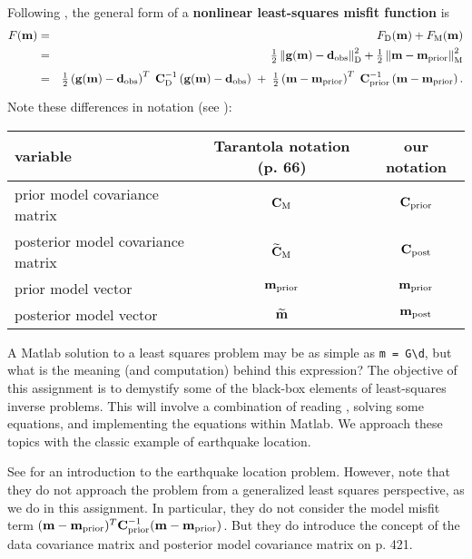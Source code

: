 \documentclass[11pt,titlepage,fleqn]{article}
\begin{document}
Following \citet[][p.~205]{Tarantola2005}, the general form of a {\bf nonlinear least-squares misfit function} is
%
\begin{eqnarray*}
\misfitvar(\bem) &=& \misfitvar_{\rm D}(\bem) + \misfitvar_{\rm M}(\bem) 
\\
&=& \hlf \left\| \bg(\bem) - \bd_{\rm obs} \right\|^2_{\rm D} + \hlf \left\| \bem - \mprior \right\|^2_{\rm M}
\nonumber \\
&=& \hlf \left( \bg(\bem) - \bd_{\rm obs}\right)^T \; \covdi \left( \bg(\bem) - \bd_{\rm obs} \right)
\;+\; \hlf \left( \bem - \mprior \right)^T \; \cpriori \left( \bem - \mprior \right).
\nonumber
\end{eqnarray*}
%
Note these differences in notation (see ):

\vspace{0.2cm}
\begin{tabular}{l|c|c}
\hline
variable                            & Tarantola notation (p. 66)       & our notation \\ \hline
prior model covariance matrix       & $\mbox{${\bf C}$}_{\rm M}$                     & $\mbox{${\bf C}$}_{\rm prior}$    \\ \hline
posterior model covariance matrix   & $\widetilde{\mbox{${\bf C}$}}_{\rm M}$         & $\mbox{${\bf C}$}_{\rm post}$     \\ \hline
prior model vector                  & $\mbox{${\bf m}$}_{\rm prior}$                        & $\mbox{${\bf m}$}_{\rm prior}$     \\ \hline
posterior model vector              & $\widetilde{\mbox{${\bf m}$}}$               & $\mbox{${\bf m}$}_{\rm post}$     \\ \hline
\hline
\end{tabular}
\vspace{0.2cm}

A Matlab solution to a least squares problem may be as simple as \verb+m = G\d+, but what is the meaning (and computation) behind this expression? The objective of this assignment is to demystify some of the black-box elements of least-squares inverse problems. This will involve a combination of reading \citet{Tarantola2005}, solving some equations, and implementing the equations within Matlab. We approach these topics with the classic example of earthquake location.

See \citet[][Chapter 7]{SteinWysession} for an introduction to the earthquake location problem. However, note that they do not approach the problem from a generalized least squares perspective, as we do in this assignment. In particular, they do not consider the model misfit term $(\mbox{${\bf m}$}-\mbox{${\bf m}$}_{\rm prior})^T \mbox{${\bf C}$}_{\rm prior}^{-1} (\mbox{${\bf m}$}-\mbox{${\bf m}$}_{\rm prior})$. But they do introduce the concept of the data covariance matrix and posterior model covariance matrix on p. 421.
\end{document}
